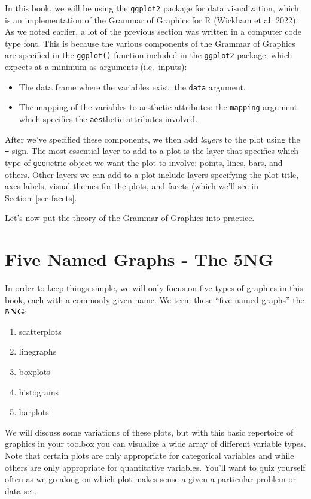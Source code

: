\documentclass[
  letterpaper,
  DIV=11,
  numbers=noendperiod]{scrreprt}
\providecommand{\tightlist}{%
  \setlength{\itemsep}{0pt}\setlength{\parskip}{0pt}}\usepackage{longtable,booktabs,array}
\theoremstyle{definition}
\theoremstyle{remark}
\begin{document}
In this book, we will be using the \texttt{ggplot2} package for data
visualization, which is an implementation of the Grammar of Graphics for
R (Wickham et al. 2022). As we noted earlier, a lot of the previous
section was written in a computer code type font. This is because the
various components of the Grammar of Graphics are specified in the
\texttt{ggplot()} function included in the \texttt{ggplot2} package,
which expects at a minimum as arguments (i.e.~inputs):

\begin{itemize}
\tightlist
\item
  The data frame where the variables exist: the \texttt{data} argument.
\item
  The mapping of the variables to aesthetic attributes: the
  \texttt{mapping} argument which specifies the \texttt{aes}thetic
  attributes involved.
\end{itemize}

After we've specified these components, we then add \emph{layers} to the
plot using the \texttt{+} sign. The most essential layer to add to a
plot is the layer that specifies which type of \texttt{geom}etric object
we want the plot to involve: points, lines, bars, and others. Other
layers we can add to a plot include layers specifying the plot title,
axes labels, visual themes for the plots, and facets (which we'll see in
Section~\ref{sec-facets}.

Let's now put the theory of the Grammar of Graphics into practice.

\hypertarget{sec-five-ng}{%
\section{Five Named Graphs - The 5NG}\label{sec-five-ng}}

In order to keep things simple, we will only focus on five types of
graphics in this book, each with a commonly given name. We term these
``five named graphs'' the \textbf{5NG}:

\begin{enumerate}
\def\labelenumi{\arabic{enumi}.}
\tightlist
\item
  scatterplots
\item
  linegraphs
\item
  boxplots
\item
  histograms
\item
  barplots
\end{enumerate}

We will discuss some variations of these plots, but with this basic
repertoire of graphics in your toolbox you can visualize a wide array of
different variable types. Note that certain plots are only appropriate
for categorical variables and while others are only appropriate for
quantitative variables. You'll want to quiz yourself often as we go
along on which plot makes sense a given a particular problem or data
set.
\end{document}

